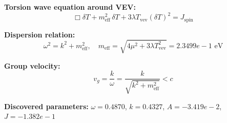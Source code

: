 
\textbf{Torsion wave equation around VEV:}
\begin{equation}
  \Box \delta T + m_{\text{eff}}^2 \, \delta T + 3\lambda T_{\text{vev}} (\delta T)^2 = J_{\text{spin}}
\end{equation}

\textbf{Dispersion relation:}
\begin{equation}
  \omega^2 = k^2 + m_{\text{eff}}^2, \quad
  m_{\text{eff}} = \sqrt{4\mu^2 + 3\lambda T_{\text{vev}}^2} = 2.3499e-1 \text{ eV}
\end{equation}

\textbf{Group velocity:}
\begin{equation}
  v_g = \frac{k}{\omega} = \frac{k}{\sqrt{k^2 + m_{\text{eff}}^2}} < c
\end{equation}

\textbf{Discovered parameters:}
$\omega = 0.4870$, \quad
$k = 0.4327$, \quad
$A = -3.419e-2$, \quad
$J = -1.382e-1$